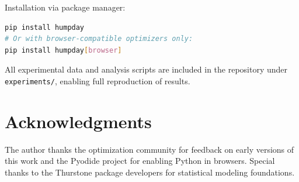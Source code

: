 \documentclass[article]{jss}
\begin{document}
Installation via package manager:
\begin{lstlisting}[language=bash]
pip install humpday
# Or with browser-compatible optimizers only:
pip install humpday[browser]
\end{lstlisting}

All experimental data and analysis scripts are included in the repository under \texttt{experiments/}, enabling full reproduction of results.

\section*{Acknowledgments}

The author thanks the optimization community for feedback on early versions of this work and the Pyodide project for enabling Python in browsers. Special thanks to the Thurstone package developers for statistical modeling foundations.


\end{document}

